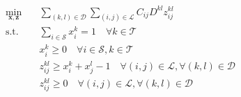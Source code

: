 \begin{subequations}\label{eq:opt_stage_lin1}
	\begin{align}
		\min_{\mathbf{x},\mathbf{z}} \quad & \sum_{(k,l)\in\mathcal{D}}\sum_{(i,j)\in\mathcal{L}}C_{ij}D^{kl}z_{ij}^{kl} \nonumber \\
		\text{s.t.}\quad & \sum_{i\in\mathcal{S}}x_i^k = 1 \quad \forall k\in\mathcal{T} \label{eq:opt_stage_lin1-sum1} \\
		& x_i^k \geq 0 \quad \forall i\in\mathcal{S},k\in\mathcal{T} \label{eq:opt_stage_lin1-xnonneg} \\
		& z_{ij}^{kl} \geq x_i^k+x_j^l-1 \quad \forall (i,j)\in\mathcal{L}, \forall(k,l)\in\mathcal{D} \label{eq:opt_stage_line1-z}\\
		& z_{ij}^{kl} \geq 0 \quad \forall (i,j)\in\mathcal{L}, \forall(k,l)\in\mathcal{D} \label{eq:opt_stage_lin1-znonneg}
	\end{align}
\end{subequations}

